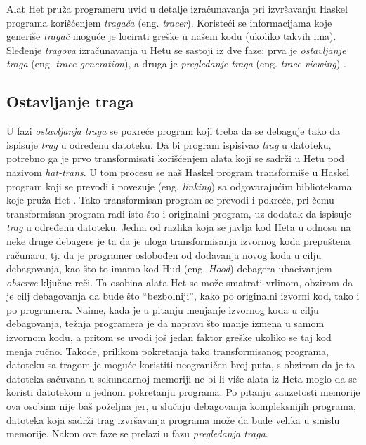\documentclass[a4paper]{article}
\begin{document}
{{Alat Het pruža programeru uvid u detalje izračunavanja pri izvršavanju Haskel programa korišćenjem {\em tragača} (eng. {\em tracer}). 
Koristeći se informacijama koje generiše {\em tragač} moguće je locirati greške u našem kodu (ukoliko takvih ima).
Sleđenje {\em tragova} izračunavanja u Hetu se sastoji iz dve faze: prva je {\em ostavljanje traga} (eng. {\em trace generation}), a druga je {\em pregledanje traga} (eng. {\em trace viewing}) \cite{chitil2002transforming}.

\subsection{Ostavljanje traga}
U fazi {\em ostavljanja traga} se pokreće program koji treba da se debaguje tako da ispisuje {\em trag} u određenu datoteku. Da bi program ispisivao {\em trag} u datoteku,
potrebno ga je prvo transformisati korišćenjem alata koji se sadrži u Hetu pod nazivom {\em hat-trans}. U tom procesu se naš Haskel program transformiše u
Haskel program koji se prevodi i povezuje (eng. {\em linking}) sa odgovarajućim bibliotekama koje pruža Het \cite{chitil2002transforming}. Tako transformisan program se prevodi i pokreće,
pri čemu transformisan program radi isto što i originalni program, uz dodatak da ispisuje {\em trag} u određenu datoteku. %
Jedna od razlika koja se javlja kod Heta u odnosu na neke druge debagere je ta da je uloga transformisanja izvornog koda prepuštena računaru, tj. da je programer oslobođen od dodavanja novog koda u cilju debagovanja, kao što to imamo kod Hud (eng. {\em Hood}) debagera ubacivanjem {\em observe} ključne reči.
Ta osobina alata Het se može smatrati vrlinom, obzirom da je cilj debagovanja da bude što ``bezbolniji'', kako po originalni izvorni kod, 
tako i po programera. Naime, kada je u pitanju menjanje izvornog koda u cilju debagovanja, težnja programera je da napravi što manje izmena u samom 
izvornom kodu, a pritom se uvodi još jedan faktor greške ukoliko se taj kod menja ručno.
Takođe, prilikom pokretanja tako transformisanog programa, datoteku sa tragom je moguće koristiti neograničen broj puta, s obzirom da je ta datoteka sačuvana u sekundarnoj memoriji ne bi li više alata iz Heta moglo da se koristi datotekom u jednom pokretanju programa.
Po pitanju zauzetosti memorije ova osobina nije baš poželjna jer, u slučaju debagovanja kompleksnijih programa, datoteka koja sadrži trag izvršavanja programa može da bude velika u smislu memorije.
Nakon ove faze se prelazi u fazu {\em pregledanja traga}.

}}
\end{document}
